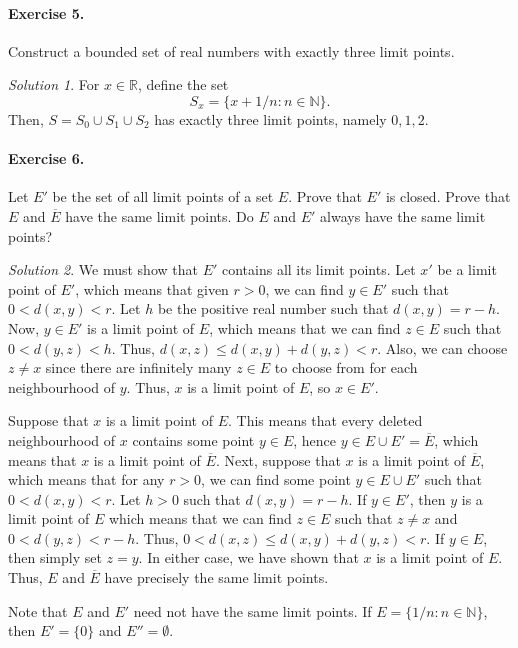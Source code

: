 \documentclass[11pt]{report}
\def\R{\mathbb{R}}
\def\N{\mathbb{N}}
\theoremstyle{remark}
\newtheorem*{solution}{Solution}
\begin{document}
    \paragraph{Exercise 5.} Construct a bounded set of real numbers with exactly
    three limit points.
    \begin{solution}
        For $x \in \R$, define the set \[
           S_x = \{x + 1 / n : n \in \N\}.
        \] Then, $S = S_0 \cup S_1 \cup S_2$ has exactly three limit points, namely
        $0, 1, 2$.
    \end{solution}

    \paragraph{Exercise 6.} Let $E'$ be the set of all limit points of a set $E$.
    Prove that $E'$ is closed. Prove that $E$ and $\overline{E}$ have the same limit
    points. Do $E$ and $E'$ always have the same limit points?
    \begin{solution}
        We must show that $E'$ contains all its limit points. Let $x'$ be a limit
        point of $E'$, which means that given $r > 0$, we can find $y \in E'$ such
        that $0 < d(x, y) < r$. Let $h$ be the positive real number such that $d(x,
        y) = r - h$. Now, $y \in E'$ is a limit point of $E$, which means that we
        can find $z \in E$ such that $0 < d(y, z) < h$.  Thus, $d(x, z) \leq d(x, y)
        + d(y, z) < r$. Also, we can choose $z \neq x$ since there are infinitely
        many $z \in E$ to choose from for each neighbourhood of $y$. Thus, $x$ is a
        limit point of $E$, so $x \in E'$.

        Suppose that $x$ is a limit point of $E$. This means that every
        deleted neighbourhood of $x$ contains some point $y \in E$, hence $y \in E
        \cup E' = \overline{E}$, which means that $x$ is a limit point of
        $\overline{E}$. Next, suppose that $x$ is a limit point of $\overline{E}$,
        which means that for any $r > 0$, we can find some point $y \in E \cup E'$
        such that $0 < d(x, y) < r$. Let $h > 0$ such that $d(x, y) = r - h$. If $y
        \in E'$, then $y$ is a limit point of $E$ which means that we can find $z
        \in E$ such that $z \neq x$ and $0 < d(y, z) < r - h$. Thus, $0 < d(x, z)
        \leq d(x, y) + d(y, z) < r$. If $y \in E$, then simply set $z = y$. In
        either case, we have shown that $x$ is a limit point of $E$. Thus, $E$ and
        $\overline{E}$ have precisely the same limit points.

        Note that $E$ and $E'$ need not have the same limit points. If $E = \{1 / n
        : n \in \N\}$, then $E' = \{0\}$ and $E'' = \emptyset$.
    \end{solution}
\end{document}
